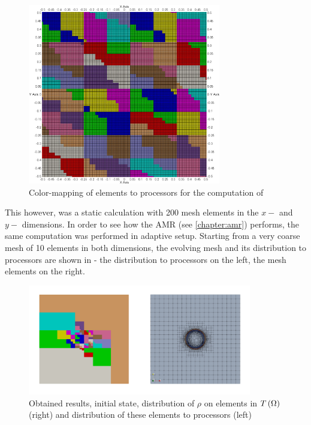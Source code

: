 \begin{figure}[H]
	\begin{center}
		\includegraphics[width=0.75\textwidth]{img/mhd-blast/old/subdomain.jpg}
	\caption{Color-mapping of elements to processors for the computation of }
	\label{figure:subdomainsBlastOld}
	\end{center}
\end{figure}
\vspace{-5mm}

This however, was a static calculation with 200 mesh elements in the $x-$ and $y-$ dimensions. In order to see how the AMR (see \cref{chapter:amr}) performs, the same computation was performed in adaptive setup. Starting from a very coarse mesh of 10 elements in both dimensions, the evolving mesh and its distribution to processors are shown in  - the distribution to processors on the left, the mesh elements on the right.

\begin{figure}[H]
	\begin{center}
		\includegraphics[width=0.87\textwidth]{img/mhd-blast/old/mya1.jpg}
	\caption{Obtained results, initial state, distribution of $\rho$ on elements in $T\left(\Omega\right)$ (right) and distribution of these elements to processors (left)}
	\label{figure:blastOldMyAdapt1}
	\end{center}
\end{figure}
\vspace{-8mm}

